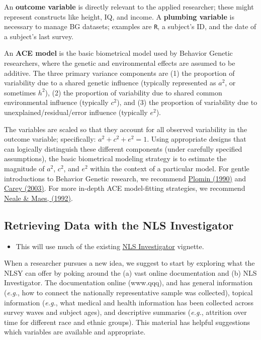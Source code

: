 \documentclass[smallextended]{svjour3}       %
\providecommand{\tightlist}{%
  \setlength{\itemsep}{0pt}\setlength{\parskip}{0pt}}
\begin{document}
An \textbf{outcome variable} is directly relevant to the applied
researcher; these might represent constructs like height, IQ, and
income. A \textbf{plumbing variable} is necessary to manage BG datasets;
examples are \texttt{R}, a subject's ID, and the date of a subject's
last survey.

An \textbf{ACE model} is the basic biometrical model used by Behavior
Genetic researchers, where the genetic and environmental effects are
assumed to be additive. The three primary variance components are (1)
the proportion of variability due to a shared genetic influence
(typically represented as \(a^2\), or sometimes \(h^2\)), (2) the
proportion of variability due to shared common environmental influence
(typically \(c^2\)), and (3) the proportion of variability due to
unexplained/residual/error influence (typically \(e^2\)).

The variables are scaled so that they account for all observed
variability in the outcome variable; specifically:
\(a^2 + c^2 + e^2 = 1\). Using appropriate designs that can logically
distinguish these different components (under carefully specified
assumptions), the basic biometrical modeling strategy is to estimate the
magnitude of \(a^2\), \(c^2\), and \(e^2\) within the context of a
particular model. For gentle introductions to Behavior Genetic research,
we recommend
\href{http://books.google.com/books?id=r7AgAQAAIAAJ\&source=gbs_navlinks_s}{Plomin
(1990)} and \href{http://psych.colorado.edu/~carey/hgss/}{Carey (2003)}.
For more in-depth ACE model-fitting strategies, we recommend
\href{http://www.vipbg.vcu.edu/OpenMxFall09/NMbook05.pdf}{Neale \& Maes,
(1992)}.

\hypertarget{retrieving-data-with-the-nls-investigator}{%
\subsection{Retrieving Data with the NLS
Investigator}\label{retrieving-data-with-the-nls-investigator}}

\begin{itemize}
\tightlist
\item
  This will use much of the existing
  \href{https://nlsy-links.github.io/NlsyLinks/docs/articles/nls-investigator.html}{NLS
  Investigator} vignette.
\end{itemize}

When a researcher pursues a new idea, we suggest to start by exploring
what the NLSY can offer by poking around the (a) vast online
documentation and (b) NLS Investigator. The documentation online
(www.qqq), and has general information (\emph{e.g.}, how to connect the
nationally representative sample was collected), topical information
(\emph{e.g.}, what medical and health information has been collected
across survey waves and subject ages), and descriptive summaries
(\emph{e.g.}, attrition over time for different race and ethnic groups).
This material has helpful suggestions which variables are available and
appropriate.
\end{document}

